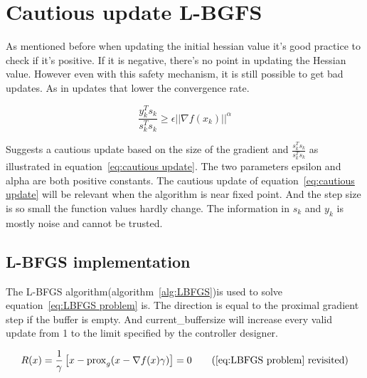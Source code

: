 	\section{Cautious update L-BGFS}
	As mentioned before when updating the initial hessian value it's good practice to check if it's positive. If it is negative, there's no point in updating the Hessian value. However even with this safety mechanism, it is still possible to get bad updates. As in updates that lower the convergence rate.
	
	\begin{equation}
		\frac{y_k^Ts_k}{s_k^Ts_k} \ge \epsilon ||\nabla f(x_k)||^\alpha
		\label{eq:cautious update}
	\end{equation}
	
	\cite{Dong-HuiLi1999} Suggests a cautious update based on the size of the gradient and $\frac{s_k^Ts_k}{s_k^Ts_k}$ as illustrated in equation~\ref{eq:cautious update}. The two parameters epsilon and alpha are both positive constants. The cautious update of equation~\ref{eq:cautious update} will be relevant when the algorithm is near fixed point. And the step size is so small the function values hardly change. The information in $s_k$ and $y_k$ is mostly noise and cannot be trusted.
	
	\subsection{L-BFGS implementation}
		The L-BFGS algorithm(algorithm~\ref{alg:LBFGS})is used to solve equation~\ref{eq:LBFGS problem} is. The direction is equal to the proximal gradient step if the buffer is empty. And current\_buffersize will increase every valid update from 1 to the limit specified by the controller designer.
		
		\begin{equation}
			R(x) = \frac{1}{\gamma}\left[ x - \prox_g( x - \nabla f(x)\gamma) \right] = 0
			\tag{\ref{eq:LBFGS problem} revisited}
		\end{equation}
		
